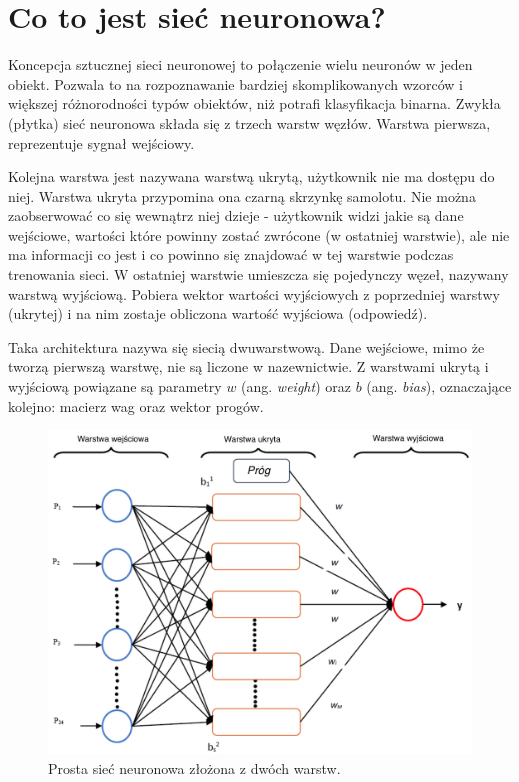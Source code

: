 \documentclass[12pt,a4paper,twoside,titlepage,openright]{book}
\begin{document}
\section{Co to jest sieć neuronowa?}
Koncepcja sztucznej sieci neuronowej to połączenie wielu neuronów w jeden obiekt. Pozwala to na rozpoznawanie bardziej skomplikowanych wzorców i większej różnorodności typów obiektów, niż potrafi klasyfikacja binarna. Zwykła (płytka) sieć neuronowa składa się z trzech warstw węzłów. Warstwa pierwsza, reprezentuje sygnał wejściowy.

Kolejna warstwa jest nazywana warstwą ukrytą, użytkownik nie ma dostępu do niej. Warstwa ukryta przypomina ona czarną skrzynkę samolotu. Nie można zaobserwować co się wewnątrz niej dzieje - użytkownik widzi jakie są dane wejściowe, wartości które powinny zostać zwrócone (w ostatniej warstwie), ale nie ma informacji co jest i co powinno się znajdować w tej warstwie podczas trenowania sieci.
W ostatniej warstwie umieszcza się pojedynczy węzeł, nazywany warstwą wyjściową. Pobiera wektor wartości wyjściowych z poprzedniej warstwy (ukrytej) i na nim zostaje obliczona wartość wyjściowa (odpowiedź).

Taka architektura nazywa się siecią dwuwarstwową. Dane wejściowe, mimo że tworzą pierwszą warstwę, nie są liczone w nazewnictwie.
Z warstwami ukrytą i wyjściową powiązane są parametry \(w\) (ang. \textit{weight}) oraz \(b\) (ang. \textit{bias}), oznaczające kolejno: macierz wag oraz wektor progów.

\begin{figure}[ht]
	\centering
			\includegraphics[resolution=100, scale=0.2]{SiecNeuronowa.png}
		\caption{Prosta sieć neuronowa złożona z dwóch warstw.}
\end{figure}
\end{document}

